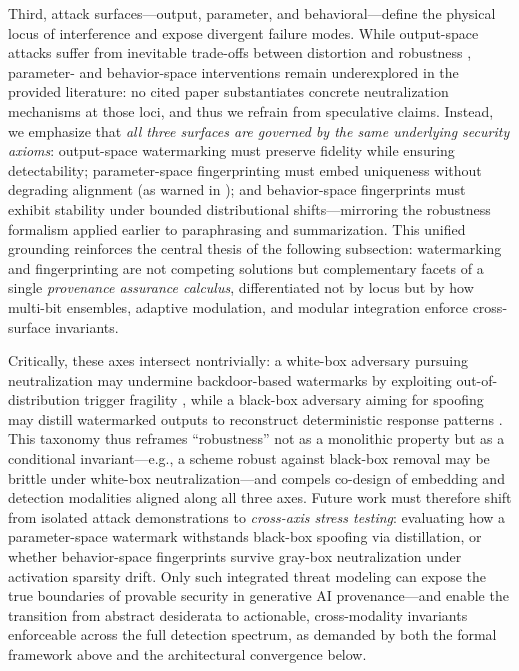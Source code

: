 \documentclass[11pt,a4paper]{article}
\begin{document}
Third, attack surfaces---output, parameter, and behavioral---define the physical locus of interference and expose divergent failure modes. While output-space attacks suffer from inevitable trade-offs between distortion and robustness \cite{arxiv:2505.06827}, parameter- and behavior-space interventions remain underexplored in the provided literature: no cited paper substantiates concrete neutralization mechanisms at those loci, and thus we refrain from speculative claims. Instead, we emphasize that \emph{all three surfaces are governed by the same underlying security axioms}: output-space watermarking must preserve fidelity while ensuring detectability; parameter-space fingerprinting must embed uniqueness without degrading alignment (as warned in \cite{doi:10.14722/ndss.2026.230138}); and behavior-space fingerprints must exhibit stability under bounded distributional shifts---mirroring the robustness formalism applied earlier to paraphrasing and summarization. This unified grounding reinforces the central thesis of the following subsection: watermarking and fingerprinting are not competing solutions but complementary facets of a single \emph{provenance assurance calculus}, differentiated not by locus but by how multi-bit ensembles, adaptive modulation, and modular integration enforce cross-surface invariants.

Critically, these axes intersect nontrivially: a white-box adversary pursuing neutralization may undermine backdoor-based watermarks by exploiting out-of-distribution trigger fragility \cite{arxiv:2409.06130}, while a black-box adversary aiming for spoofing may distill watermarked outputs to reconstruct deterministic response patterns \cite{arxiv:2402.19361}. This taxonomy thus reframes ``robustness'' not as a monolithic property but as a conditional invariant---e.g., a scheme robust against black-box removal may be brittle under white-box neutralization---and compels co-design of embedding and detection modalities aligned along all three axes. Future work must therefore shift from isolated attack demonstrations to \emph{cross-axis stress testing}: evaluating how a parameter-space watermark withstands black-box spoofing via distillation, or whether behavior-space fingerprints survive gray-box neutralization under activation sparsity drift. Only such integrated threat modeling can expose the true boundaries of provable security in generative AI provenance---and enable the transition from abstract desiderata to actionable, cross-modality invariants enforceable across the full detection spectrum, as demanded by both the formal framework above and the architectural convergence below.
\end{document}
